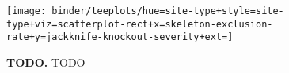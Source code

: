 \begin{figure}
  \centering
  \texttt{[image: binder/teeplots/hue=site-type+style=site-type+viz=scatterplot-rect+x=skeleton-exclusion-rate+y=jackknife-knockout-severity+ext=]}
  \vspace{-0.25in}
  \caption{%
    \textbf{TODO.} 
    \scriptsize
    TODO
  }
  \label{fig:epistatic}
  \vspace{-0.25in}
\end{figure}
